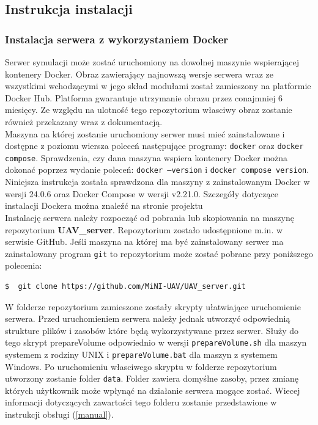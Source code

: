 \documentclass[15pt]{sprawozdanie}
\begin{document}
\subsection{Instrukcja instalacji}
\subsubsection{Instalacja serwera z wykorzystaniem Docker} \label{docker_server}

Serwer symulacji może zostać uruchomiony na dowolnej maszynie wspierającej kontenery Docker. Obraz zawierający najnowszą wersje serwera wraz ze wszystkimi wchodzącymi w jego skład modułami został zamieszony na platformie Docker Hub. Platforma gwarantuje utrzymanie obrazu przez conajmniej 6 miesięcy. Ze względu na ulotność tego repozytorium własciwy obraz zostanie również przekazany wraz z dokumentacją.\\

Maszyna na której zostanie uruchomiony serwer musi mieć zainstalowane i dostępne z poziomu wiersza poleceń następujące programy: \texttt{docker} oraz \texttt{docker compose}. Sprawdzenia, czy dana maszyna wspiera kontenery Docker można dokonać poprzez wydanie poleceń: \texttt{docker --version} i \texttt{docker compose version}. Niniejsza instrukcja została sprawdzona dla maszyny z zainstalowanym Docker w wersji 24.0.6 oraz Docker Compose w wersji v2.21.0. Szczegóły dotyczące instalacji Dockera można znaleźć na stronie projektu \cite{docker}\\

Instalację serwera należy rozpocząć od pobrania lub skopiowania na maszynę repozytorium \textbf{UAV\_server}. Repozytorium zostało udostępnione m.in. w serwisie GitHub. Jeśli maszyna na której ma być zainstalowany serwer ma zainstalowany program \texttt{git} to repozytorium może zostać pobrane przy poniższego polecenia:
\begin{lstlisting}[language=bash]
  $  git clone https://github.com/MiNI-UAV/UAV_server.git
\end{lstlisting}

W folderze repozytorium zamieszone zostały skrypty ułatwiające uruchomienie serwera. Przed uruchomieniem serwera należy jednak utworzyć odpowiednią strukture plików i zasobów które będą wykorzystywane przez serwer. Służy do tego skrypt prepareVolume odpowiednio w wersji  \texttt{prepareVolume.sh} dla maszyn systemem z rodziny UNIX i  \texttt{prepareVolume.bat} dla maszyn z systemem Windows. Po uruchomieniu własciwego skryptu w folderze repozytorium utworzony zostanie folder \texttt{data}. Folder zawiera domyślne zasoby, przez zmianę których użytkownik może wpłynąć na działanie serwera mogące zostać.  Wiecej informacji dotyczących zawartości tego folderu zostanie przedstawione w instrukcji obsługi (\ref{manual}).\\
\end{document}
